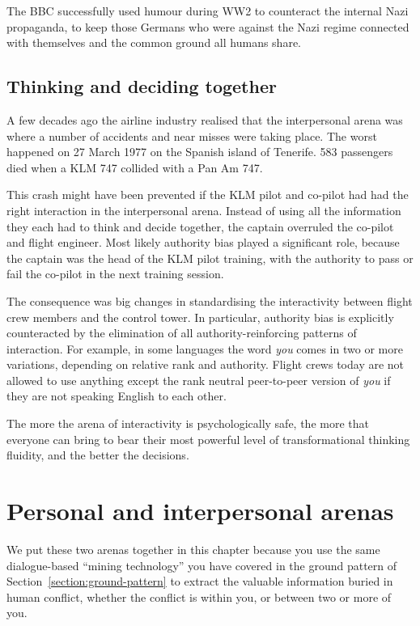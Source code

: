 The BBC\cite{bbc-humour-nazi}  successfully used humour during WW2 to counteract the internal Nazi propaganda, to keep those Germans who were against the Nazi regime connected with themselves and the common ground all humans share. 


\subsection{Thinking and deciding together}
A few decades ago the airline industry realised that the interpersonal arena was where a number of accidents and near misses were taking place. The worst happened on 27 March 1977 on the Spanish island of Tenerife. 583 passengers died when a KLM 747 collided with a Pan Am 747. 


This crash might have been prevented if the KLM pilot and co-pilot had had the right interaction in the interpersonal arena. Instead of using all the information they each had to think and decide together, the captain overruled the co-pilot and flight engineer. Most likely authority bias played a significant role, because the captain was the head of the KLM pilot training, with the authority to pass or fail the co-pilot in the next training session.


The consequence was big changes in standardising the interactivity between flight crew members and the control tower. In particular, authority bias is explicitly counteracted by the elimination of all authority-reinforcing patterns of interaction. For example, in some languages the word \emph{you} comes in two or more variations, depending on relative rank and authority. Flight crews today are not allowed to use anything except the rank neutral peer-to-peer version of \emph{you} if they are not speaking English to each other. 


The more the arena of interactivity is psychologically safe,  the more that everyone can bring to bear their most powerful level of transformational thinking fluidity, and the better the decisions.




\section{Personal and interpersonal arenas}
We put these two arenas together in this chapter because you use the same dialogue-based “mining technology” you have covered in the ground pattern of Section~\ref{section:ground-pattern} to extract the valuable information buried in human conflict, whether the conflict is within you, or between two or more of you.





